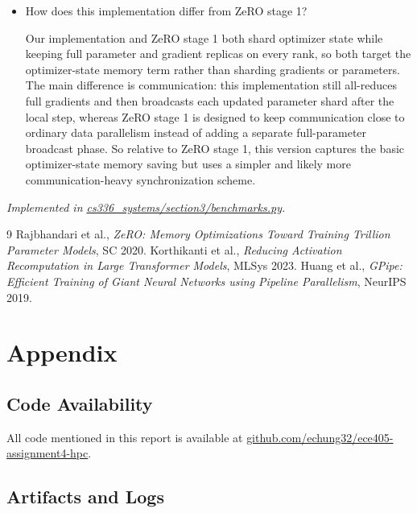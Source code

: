 \documentclass[letterpaper]{article}
\newcommand{\repofile}[2]{\href{https://github.com/echung32/ece405-assignment4-hpc/blob/main/#1}{#2}}
\begin{document}
\begin{itemize}
		\item[(c)] How does this implementation differ from ZeRO stage 1?
		
		Our implementation and ZeRO stage 1 both shard optimizer state while keeping full parameter and gradient replicas on every rank, so both target the optimizer-state memory term rather than sharding gradients or parameters.
		The main difference is communication: this implementation still all-reduces full gradients and then broadcasts each updated parameter shard after the local step, whereas ZeRO stage 1 is designed to keep communication close to ordinary data parallelism instead of adding a separate full-parameter broadcast phase.
		So relative to ZeRO stage 1, this version captures the basic optimizer-state memory saving but uses a simpler and likely more communication-heavy synchronization scheme.
	\end{itemize}
	
	\textit{Implemented in \repofile{cs336_systems/section3/benchmarks.py}{cs336\_systems/section3/benchmarks.py}.}
	
	\renewcommand{\refname}{References}
	\begin{thebibliography}{9}
		 Rajbhandari et al., \emph{ZeRO: Memory Optimizations Toward Training Trillion Parameter Models}, SC 2020.
		 Korthikanti et al., \emph{Reducing Activation Recomputation in Large Transformer Models}, MLSys 2023.
		 Huang et al., \emph{GPipe: Efficient Training of Giant Neural Networks using Pipeline Parallelism}, NeurIPS 2019.
	\end{thebibliography}
	
	\appendix
	
	\section{Appendix}
	
	\subsection{Code Availability}
	
	All code mentioned in this report is available at \href{https://github.com/echung32/ece405-assignment4-hpc}{github.com/echung32/ece405-assignment4-hpc}.
	
	\subsection{Artifacts and Logs}
	
\end{document}
